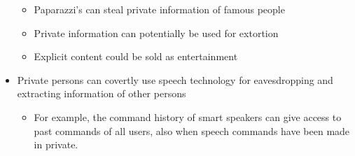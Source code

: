 \documentclass[letterpaper,10pt,english]{jupyterBook}
\begin{document}
\begin{itemize}
\begin{itemize}
\item {} 
\sphinxAtStartPar
Paparazzi’s can steal private information of famous people

\item {} 
\sphinxAtStartPar
Private information can potentially be used for extortion

\item {} 
\sphinxAtStartPar
Explicit content could be sold as entertainment

\end{itemize}

\item {} 
\sphinxAtStartPar
Private persons can covertly use speech technology for eavesdropping
and extracting information of other persons
\begin{itemize}
\item {} 
\sphinxAtStartPar
For example, the command history of smart speakers can give
access to past commands of all users, also when speech commands
have been made in private.

\end{itemize}

\end{itemize}
\end{document}
